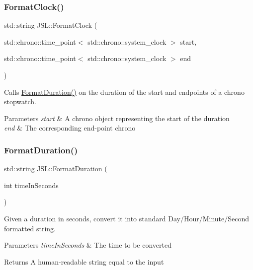 \subsubsection{\texorpdfstring{Format\+Clock()}{FormatClock()}}
{\footnotesize\ttfamily std\+::string J\+S\+L\+::\+Format\+Clock (\begin{DoxyParamCaption}\item[{std\+::chrono\+::time\+\_\+point$<$ std\+::chrono\+::system\+\_\+clock $>$}]{start,  }\item[{std\+::chrono\+::time\+\_\+point$<$ std\+::chrono\+::system\+\_\+clock $>$}]{end }\end{DoxyParamCaption})\hspace{0.3cm}{\ttfamily [inline]}}

Calls \hyperlink{namespaceJSL_ad7ff2220bbab0294b95b9aa85332a222}{Format\+Duration()} on the duration of the start and endpoints of a {\ttfamily chrono} stopwatch. 
\begin{DoxyParams}{Parameters}
{\em start} & A {\ttfamily chrono} object representing the start of the duration \\
\hline
{\em end} & The corresponding end-\/point {\ttfamily chrono} \\
\hline
\end{DoxyParams}
\mbox{\label{namespaceJSL_ad7ff2220bbab0294b95b9aa85332a222}} 
\subsubsection{\texorpdfstring{Format\+Duration()}{FormatDuration()}}
{\footnotesize\ttfamily std\+::string J\+S\+L\+::\+Format\+Duration (\begin{DoxyParamCaption}\item[{int}]{time\+In\+Seconds }\end{DoxyParamCaption})\hspace{0.3cm}{\ttfamily [inline]}}

Given a duration in seconds, convert it into standard Day/\+Hour/\+Minute/\+Second formatted string. 
\begin{DoxyParams}{Parameters}
{\em time\+In\+Seconds} & The time to be converted \\
\hline
\end{DoxyParams}
\begin{DoxyReturn}{Returns}
A human-\/readable string equal to the input 
\end{DoxyReturn}
\mbox{\label{namespaceJSL_a1db6f26ec58c53d1a56375c0f1b27c77}} 
